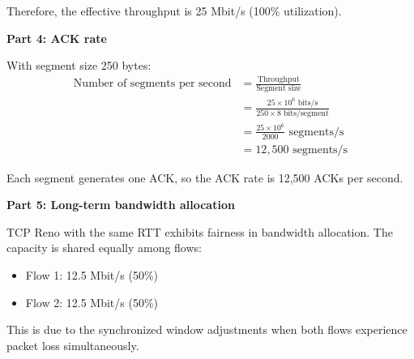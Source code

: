 \documentclass[11pt,a4paper]{article}
\begin{document}
Therefore, the effective throughput is 25 Mbit/s (100\% utilization).

\textbf{Part 4: ACK rate}

With segment size 250 bytes:
\begin{align}
\text{Number of segments per second} &= \frac{\text{Throughput}}{\text{Segment size}}\\
&= \frac{25 \times 10^6 \text{ bits/s}}{250 \times 8 \text{ bits/segment}}\\
&= \frac{25 \times 10^6}{2000} \text{ segments/s}\\
&= 12,500 \text{ segments/s}
\end{align}

Each segment generates one ACK, so the ACK rate is 12,500 ACKs per second.

\textbf{Part 5: Long-term bandwidth allocation}

TCP Reno with the same RTT exhibits fairness in bandwidth allocation. The capacity is shared equally among flows:
\begin{itemize}
    \item Flow 1: 12.5 Mbit/s (50\%)
    \item Flow 2: 12.5 Mbit/s (50\%)
\end{itemize}

This is due to the synchronized window adjustments when both flows experience packet loss simultaneously.
\end{document}
